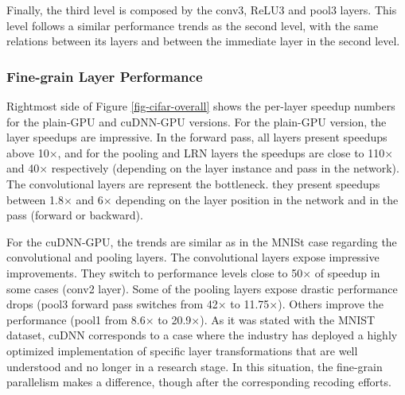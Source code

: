 Finally, the third level is composed by the conv3, ReLU3 and pool3 
layers. This level follows a similar performance trends as the second 
level, with the same relations between its layers and between the 
immediate layer in the second level.


\subsubsection{Fine-grain Layer Performance}
Rightmost side of Figure \ref{fig-cifar-overall} shows the per-layer
speedup numbers for the plain-GPU and cuDNN-GPU versions.
For the plain-GPU version, the layer speedups are impressive. 
In the forward pass, all layers present speedups above 10$\times$, and for 
the pooling and LRN layers the speedups are close to 110$\times$ and 40$\times$
respectively (depending on the layer instance and pass in the network). 
The convolutional layers are represent the bottleneck. they present 
speedups between 1.8$\times$ and 6$\times$ depending on the layer position in the 
network and in the pass (forward or backward).

For the cuDNN-GPU, the trends are similar as in the MNISt case 
regarding the convolutional and pooling layers. The convolutional 
layers expose impressive improvements. They switch to performance 
levels close to 50$\times$ of speedup in some cases (conv2 layer).
Some of the pooling layers expose drastic performance drops (pool3 
forward pass switches from 42$\times$ to 11.75$\times$). Others improve the 
performance (pool1 from 8.6$\times$ to 20.9$\times$). 
As it was stated with the MNIST dataset, cuDNN corresponds to a case 
where the industry has deployed a highly optimized implementation of 
specific layer transformations that are well understood and no longer 
in a research stage. In this situation, the fine-grain parallelism makes 
a difference, though after the corresponding recoding efforts.

